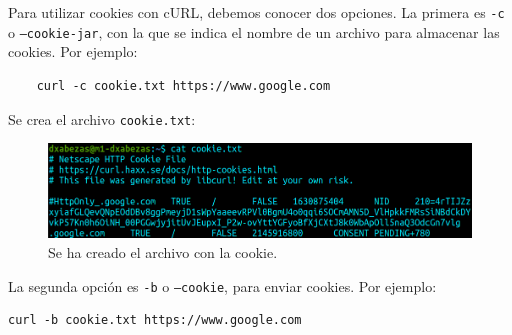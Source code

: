 \documentclass{article}
\begin{document}
Para utilizar cookies con cURL, debemos conocer dos opciones. La primera es \texttt{-c} o \texttt{--cookie-jar}, con la que se indica
el nombre de un archivo para almacenar las cookies. Por ejemplo:

\begin{verbatim}
	curl -c cookie.txt https://www.google.com
\end{verbatim}

Se crea el archivo \texttt{cookie.txt}:

\begin{figure}[H]
	\centering
	\includegraphics[width=130mm]{imgs/cookie-c}
	\caption{Se ha creado el archivo con la cookie.}
	\label{fig:cookie-c}
\end{figure}

La segunda opción es \texttt{-b} o \texttt{--cookie}, para enviar cookies. Por ejemplo:

\begin{verbatim}
curl -b cookie.txt https://www.google.com
\end{verbatim}
\end{document}
